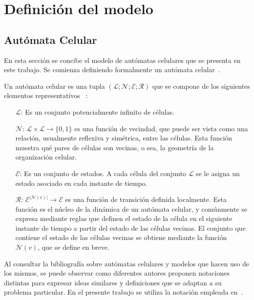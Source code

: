 \chapter{Definici\'on del modelo}\label{chapter:proposal}

\section{Aut\'omata Celular}

En esta secci\'on se concibe el modelo de aut\'omatas celulares que se presenta en este trabajo. Se comienza definiendo formalmente un aut\'omata celular~\cite{7}.

Un aut\'omata celular es una tupla $(\mathcal{L}; \mathcal{N}; \mathcal{E}; \mathcal{R})$ que se compone de los siguientes elementos representativos ~\cite{2}:
\begin{itemize}
\item [$\mathcal{L}$:] Es un conjunto potencialmente infinito de c\'elulas.
\item [$\mathcal{N}$:] $\mathcal{L} \times \mathcal{L} \rightarrow \lbrace 0,1 \rbrace$ es una funci\'on de vecindad, que puede ser vista como una relaci\'on, usualmente reflexiva y sim\'etrica, entre las c\'elulas. Esta funci\'on muestra qu\'e pares de c\'elulas son vecinas, o sea, la geometr\'ia de la organizaci\'on celular.
\item [$\mathcal{E}$:]  Es un conjunto de estados. A cada c\'elula del conjunto $\mathcal{L}$ se le asigna un estado asociado en cada instante de tiempo.
\item [$\mathcal{R}$:] $\mathcal{E}^{|\mathcal{N}(v)|} \rightarrow \mathcal{E}$ es una funci\'on de transici\'on definida localmente. Esta funci\'on es el n\'ucleo de la din\'amica de un aut\'omata celular, y com\'unmente se expresa mediante reglas que definen el estado de la c\'elula en el siguiente instante de tiempo a partir del estado de las c\'elulas vecinas. El conjunto que contiene el estado de las c\'elulas vecinas se obtiene mediante la funci\'on $\mathcal{N}(v)$, que se define en breve.
\end{itemize}

Al consultar la bibliografía sobre autómatas celulares y modelos que hacen uso de los mismos, se puede observar como diferentes autores proponen notaciones distintas  para expresar ideas similares y definiciones que se adaptan a su problema particular.
En el presente trabajo se utiliza la notaci\'on empleada en~\cite[p\'aginas 59-101]{book}. 

